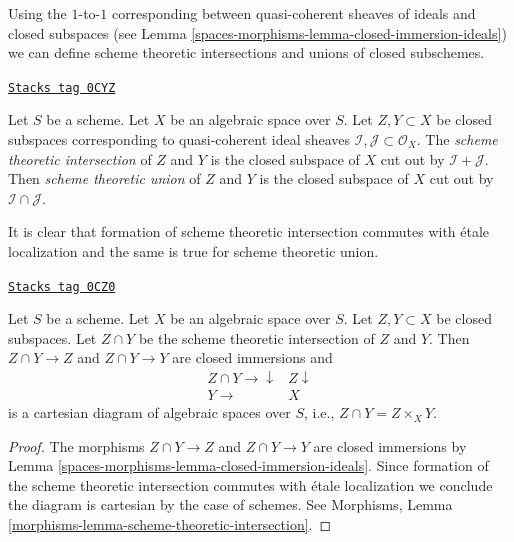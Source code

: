 Using the $1$-to-$1$ corresponding between quasi-coherent sheaves
of ideals and closed subspaces (see
Lemma \ref{spaces-morphisms-lemma-closed-immersion-ideals})
we can define scheme theoretic intersections and unions
of closed subschemes.

\begin{definition}
\label{spaces-morphisms-definition-scheme-theoretic-intersection-union}
\href{https://stacks.math.columbia.edu/tag/0CYZ}{\texttt{Stacks tag 0CYZ}}

Let $S$ be a scheme. Let $X$ be an algebraic space over $S$.
Let $Z, Y \subset X$ be closed subspaces
corresponding to quasi-coherent ideal sheaves
$\mathcal{I}, \mathcal{J} \subset \mathcal{O}_X$.
The {\it scheme theoretic intersection} of $Z$ and $Y$
is the closed subspace of $X$ cut out by $\mathcal{I} + \mathcal{J}$.
Then {\it scheme theoretic union} of $Z$ and $Y$
is the closed subspace of $X$ cut out by
$\mathcal{I} \cap \mathcal{J}$.
\end{definition}

It is clear that formation of scheme theoretic intersection
commutes with \'etale localization and the same is true for
scheme theoretic union.

\begin{lemma}
\label{spaces-morphisms-lemma-scheme-theoretic-intersection}
\href{https://stacks.math.columbia.edu/tag/0CZ0}{\texttt{Stacks tag 0CZ0}}

Let $S$ be a scheme. Let $X$ be an algebraic space over $S$.
Let $Z, Y \subset X$ be closed subspaces.
Let $Z \cap Y$ be the scheme theoretic intersection of $Z$ and $Y$.
Then $Z \cap Y \to Z$ and $Z \cap Y \to Y$ are closed immersions
and
$$
\begin{array}{cc}Z \cap Y \longrightarrow\downarrow & Z \downarrow \\ Y \longrightarrow & X\end{array}
$$
is a cartesian diagram of algebraic spaces over $S$, i.e.,
$Z \cap Y = Z \times_X Y$.
\end{lemma}

\begin{proof}
The morphisms $Z \cap Y \to Z$ and $Z \cap Y \to Y$ are closed immersions
by Lemma \ref{spaces-morphisms-lemma-closed-immersion-ideals}.
Since formation of the scheme theoretic intersection commutes
with \'etale localization we conclude the diagram is cartesian
by the case of schemes. See
Morphisms, Lemma \ref{morphisms-lemma-scheme-theoretic-intersection}.
\end{proof}

